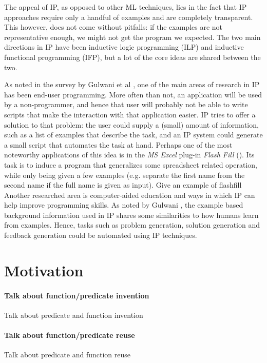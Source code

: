 \par The appeal of IP,  as opposed to other ML techniques, lies in the fact that IP approaches require only a handful of examples and are completely transparent. This however, does not come without pitfalls: if the examples are not representative enough, we might not get the program we expected. The two main directions in IP have been inductive logic programming (ILP) and inductive functional programming (IFP), but a lot of the core ideas are shared between the two.
\par As noted in the survey by Gulwani et al \cite{gulwanietal}, one of the main areas of research in IP has been end-user programming. More often than not, an application will be used by a non-programmer, and hence that user will probably not be able to write scripts that make the interaction with that application easier. IP tries to offer a solution to that problem: the user could supply a (small) amount of information, such as a list of examples that describe the task, and an IP system could generate a small script that automates the task at hand. Perhaps one of the most noteworthy applications of this idea is in the \textit{MS Excel} plug-in \textit{Flash Fill} (\cite{gulwani2012spreadsheet}). Its task is to induce a program that generalizes some spreadsheet related operation, while only being given a few examples (e.g. separate the first name from the second name if the full name is given as input).
\ac{Give an example of flashfill}
Another researched area is computer-aided education and ways in which IP can help improve programming skills. As noted by Gulwani \cite{gulwanistem}, the example based background information used in IP shares some similarities to how humans learn from examples. Hence, tasks such as problem generation, solution generation and feedback generation could be automated using IP techniques.

\section{Motivation}

\paragraph{Talk about function/predicate invention}
\ac{Talk about predicate and function invention}


\paragraph{Talk about function/predicate reuse}
\ac{Talk about predicate and function reuse}

